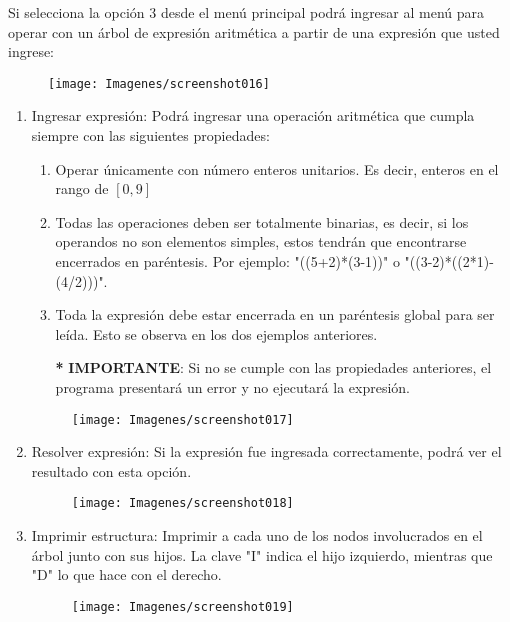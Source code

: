 \documentclass[letterpaper, 11pt]{article}
\begin{document}
	Si selecciona la opción 3 desde el menú principal podrá ingresar al menú para operar con un árbol de expresión aritmética a partir de una expresión que usted ingrese:
	
	\begin{figure}[H]
		\centering
		\texttt{[image: Imagenes/screenshot016]}
	\end{figure}
	
	\begin{enumerate}
		\item Ingresar expresión: Podrá ingresar una operación aritmética que cumpla siempre con las siguientes propiedades: 
		\begin{enumerate}
			\item Operar únicamente con número enteros unitarios. Es decir, enteros en el rango de $[0,9]$
			\item Todas las operaciones deben ser totalmente binarias, es decir, si los operandos no son elementos simples, estos tendrán que encontrarse encerrados en paréntesis. Por ejemplo: "((5+2)*(3-1))" o "((3-2)*((2*1)-(4/2)))".
			\item Toda la expresión debe estar encerrada en un paréntesis global para ser leída. Esto se observa en los dos ejemplos anteriores.
			
			\item[\textbf{*}] \textbf{IMPORTANTE}: Si no se cumple con las propiedades anteriores, el programa presentará un error y no ejecutará la expresión.
		\end{enumerate}
		
		\begin{figure}[H]
			\centering
			\texttt{[image: Imagenes/screenshot017]}
		\end{figure}
		
		\item Resolver expresión: Si la expresión fue ingresada correctamente, podrá ver el resultado con esta opción.
		
		\begin{figure}[H]
			\centering
			\texttt{[image: Imagenes/screenshot018]}
		\end{figure}
		
		\item Imprimir estructura: Imprimir a cada uno de los nodos involucrados en el árbol junto con sus hijos. La clave "I" indica el hijo izquierdo, mientras que "D" lo que hace con el derecho.
		
		\begin{figure}[H]
			\centering
			\texttt{[image: Imagenes/screenshot019]}
		\end{figure}
		
	\end{enumerate}
	
\end{document}
